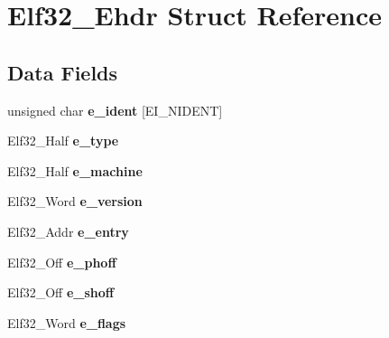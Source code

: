 \hypertarget{structElf32__Ehdr}{}\section{Elf32\+\_\+\+Ehdr Struct Reference}
\label{structElf32__Ehdr}
\subsection*{Data Fields}
\begin{DoxyCompactItemize}
\item 
unsigned char {\bfseries e\+\_\+ident} \mbox{[}E\+I\+\_\+\+N\+I\+D\+E\+NT\mbox{]}\hypertarget{structElf32__Ehdr_aba47ac5e0af02d5668782f1fd5a7466c}{}\label{structElf32__Ehdr_aba47ac5e0af02d5668782f1fd5a7466c}

\item 
Elf32\+\_\+\+Half {\bfseries e\+\_\+type}\hypertarget{structElf32__Ehdr_a49e40a791813c06e3b6ebcb53aef1bb8}{}\label{structElf32__Ehdr_a49e40a791813c06e3b6ebcb53aef1bb8}

\item 
Elf32\+\_\+\+Half {\bfseries e\+\_\+machine}\hypertarget{structElf32__Ehdr_a19bca7faba9e5573814643efc3574c7b}{}\label{structElf32__Ehdr_a19bca7faba9e5573814643efc3574c7b}

\item 
Elf32\+\_\+\+Word {\bfseries e\+\_\+version}\hypertarget{structElf32__Ehdr_aa27627bda53281221325df4dd782e800}{}\label{structElf32__Ehdr_aa27627bda53281221325df4dd782e800}

\item 
Elf32\+\_\+\+Addr {\bfseries e\+\_\+entry}\hypertarget{structElf32__Ehdr_ab8a982696048d807017919b7d0145482}{}\label{structElf32__Ehdr_ab8a982696048d807017919b7d0145482}

\item 
Elf32\+\_\+\+Off {\bfseries e\+\_\+phoff}\hypertarget{structElf32__Ehdr_a25c36fc010284a928604aae005b67ad1}{}\label{structElf32__Ehdr_a25c36fc010284a928604aae005b67ad1}

\item 
Elf32\+\_\+\+Off {\bfseries e\+\_\+shoff}\hypertarget{structElf32__Ehdr_a00601af5187a1b3f8babfe9cddd95c15}{}\label{structElf32__Ehdr_a00601af5187a1b3f8babfe9cddd95c15}

\item 
Elf32\+\_\+\+Word {\bfseries e\+\_\+flags}\hypertarget{structElf32__Ehdr_a87cf481be7917fafde0c4ecf78c8e574}{}\label{structElf32__Ehdr_a87cf481be7917fafde0c4ecf78c8e574}


\end{DoxyCompactItemize}
